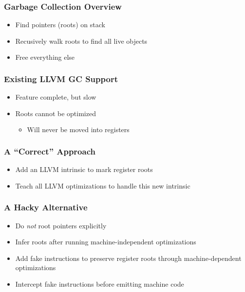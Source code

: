 \documentclass[ignorenonframetext,12pt]{beamer}
\begin{document}
\begin{frame}\frametitle{Garbage Collection Overview}
\begin{itemize}
  \item<alert@2> Find pointers (roots) on stack
  \item<alert@3> Recusively walk roots to find all live objects
  \item<alert@4> Free everything else
\end{itemize}
\end{frame}

\begin{frame}\frametitle{Existing LLVM GC Support}
\begin{itemize}
  \item Feature complete, but slow
  \item Roots cannot be optimized
  \begin{itemize}
    \item Will never be moved into registers
  \end{itemize}
\end{itemize}
\end{frame}

\begin{frame}\frametitle{A ``Correct'' Approach}
\begin{itemize}
  \item Add an LLVM intrinsic to mark register roots
  \item Teach all LLVM optimizations to handle this new intrinsic
\end{itemize}
\end{frame}

\begin{frame}\frametitle{A Hacky Alternative}
\begin{itemize}
  \item Do \emph{not} root pointers explicitly
  \item Infer roots after running machine-independent optimizations
  \item Add fake instructions to preserve register roots through machine-dependent optimizations
  \item Intercept fake instructions before emitting machine code
\end{itemize}
\end{frame}
\end{document}
